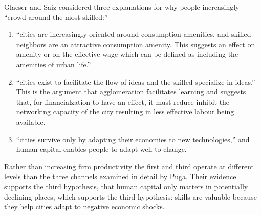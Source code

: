 


Glaeser and Saiz \cite{glaeserRiseSkilledCity2003} considered three explanations for why people increasingly ``crowd around the most skilled:'' 
\begin {enumerate} 
\item ``cities are increasingly oriented around consumption amenities, and skilled neighbors are an attractive consumption amenity. This suggests an effect on amenity or on the effective wage which can be defined as  including the  amenities of urban life.'' 
\item  ``cities exist to facilitate the flow of ideas and the skilled specialize in ideas.'' This is the argument that agglomeration facilitates learning and suggests that, for financialzation to have an effect, it must reduce inhibit the networking capacity of  the city resulting in less effective labour being available.
\item ``cities survive only by adapting their economies to new technologies,'' and human capital enables people to adapt well to change. 
\end{enumerate}
Rather than increasing firm productivity the first and third operate at  different levels than the three channels examined in detail by Puga. 
Their evidence supports the third hypothesis, %
that human capital only matters in potentially declining places, which  supports the third hypothesis: skills are valuable because they help cities adapt  to negative economic shocks. 

